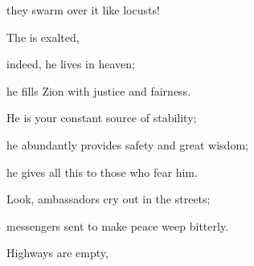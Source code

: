 {\par }{\Q they swarm over
it like locusts!
\par }{\Q {}The
{}
is exalted,
\par }{\Q indeed,
he lives
in heaven;
\par }{\Q he fills
Zion
with justice
and fairness.
\par }{\Q {}He is your constant source of stability;
\par }{\Q he abundantly
provides safety
and great wisdom;
\par }{\Q he gives all this
to those who fear him.
\par }{\Q {}Look,
ambassadors
cry out
in the streets;
\par }{\Q messengers
sent to make peace
weep
bitterly.
\par }{\Q {}Highways
are empty,

}

